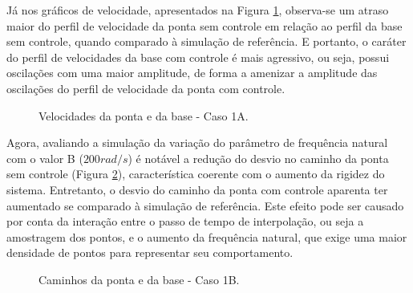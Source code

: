 Já nos gráficos de velocidade, apresentados na Figura \ref{fig:1A_vel}, observa-se um atraso maior do perfil de velocidade da ponta sem controle em relação ao perfil da base sem controle, quando comparado à simulação de referência. E portanto, o caráter do perfil de velocidades da base com controle é mais agressivo, ou seja, possui oscilações com uma maior amplitude, de forma a amenizar a amplitude das oscilações do perfil de velocidade da ponta com controle.
\begin{figure}[H]
    \centering
    \hfill
    \caption{Velocidades da ponta e da base - Caso 1A.}
    \label{fig:1A_vel}
\end{figure}

Agora, avaliando a simulação da variação do parâmetro de frequência natural com o valor B (\(200 rad/s\)) é notável a redução do desvio no caminho da ponta sem controle (Figura \ref{fig:1B_cam}), característica coerente com o aumento da rigidez do sistema. Entretanto, o desvio do caminho da ponta com controle aparenta ter aumentado se comparado à simulação de referência. Este efeito pode ser causado por conta da interação entre o passo de tempo de interpolação, ou seja a amostragem dos pontos, e o aumento da frequência natural, que exige uma maior densidade de pontos para representar seu comportamento. 

\begin{figure}[H]
    \centering
    \hfill
    \hfill
    \hfill
    \caption{Caminhos da ponta e da base - Caso 1B.}
    \label{fig:1B_cam}
\end{figure}

